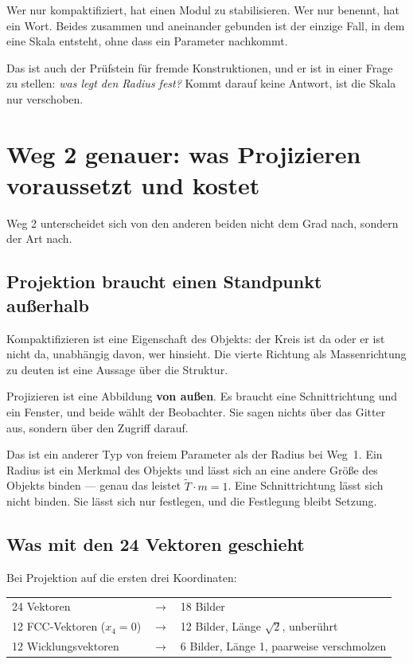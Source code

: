 \documentclass[11pt]{report}
\begin{document}
Wer nur kompaktifiziert, hat einen Modul zu stabilisieren. Wer nur
benennt, hat ein Wort. Beides zusammen und aneinander gebunden ist der
einzige Fall, in dem eine Skala entsteht, ohne dass ein Parameter
nachkommt.

Das ist auch der Prüfstein für fremde Konstruktionen, und er ist in
einer Frage zu stellen: \emph{was legt den Radius fest?} Kommt darauf
keine Antwort, ist die Skala nur verschoben.

\chapter{Weg 2 genauer: was Projizieren voraussetzt und kostet}

Weg 2 unterscheidet sich von den anderen beiden nicht dem Grad nach,
sondern der Art nach.

\section{Projektion braucht einen Standpunkt außerhalb}

Kompaktifizieren ist eine Eigenschaft des Objekts: der Kreis ist da
oder er ist nicht da, unabhängig davon, wer hinsieht. Die vierte
Richtung als Massenrichtung zu deuten ist eine Aussage über die
Struktur.

Projizieren ist eine Abbildung \textbf{von außen}. Es braucht eine
Schnittrichtung und ein Fenster, und beide wählt der Beobachter. Sie
sagen nichts über das Gitter aus, sondern über den Zugriff darauf.

Das ist ein anderer Typ von freiem Parameter als der Radius bei Weg~1.
Ein Radius ist ein Merkmal des Objekts und lässt sich an eine andere
Größe des Objekts binden --- genau das leistet
$\tilde T \cdot m = 1$. Eine Schnittrichtung lässt sich nicht binden.
Sie lässt sich nur festlegen, und die Festlegung bleibt Setzung.

\section{Was mit den 24 Vektoren geschieht}

Bei Projektion auf die ersten drei Koordinaten:
\begin{center}
\begin{tabular}{lcl}
24 Vektoren & $\longrightarrow$ & 18 Bilder \\[4pt]
12 FCC-Vektoren ($x_4 = 0$) & $\longrightarrow$
  & 12 Bilder, Länge $\sqrt2$, unberührt \\
12 Wicklungsvektoren & $\longrightarrow$
  & \phantom{1}6 Bilder, Länge 1, paarweise verschmolzen \\
\end{tabular}
\end{center}
\end{document}
